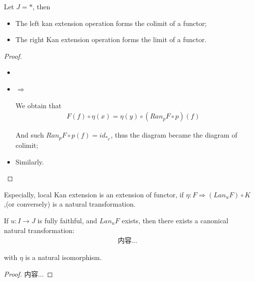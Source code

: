 \documentclass[Total.tex]{subfiles}
\begin{document}
			\begin{proposition}
				Let $J=*$, then 
				\begin{itemize}
					\item The left kan extension operation forms the colimit of a functor;
					\item The right Kan extension operation forms the limit of a functor. 
				\end{itemize}
			\end{proposition}
			\begin{proof}
				\begin{itemize}
					\item 
					
					\item 
					\begin{center}
						$\Rightarrow$
					\end{center}
					
					We obtain that
					\begin{gather*}
						F(f)\circ \eta(x)=\eta(y)\circ (Ran_p F\circ p)(f)
					\end{gather*}
					
					And such $Ran_p F\circ p(f)=id_{*_\mathcal{C}}$, thus the diagram became the diagram of colimit;
					
					\item Similarly. 
				\end{itemize}
			\end{proof}
			
			
			Especially, local Kan extension is an extension of functor, if $\eta:F\Rightarrow (Lan_u F)\circ K$,(or conversely) is a natural transformation. 
			
			\begin{proposition}
				If $u:I\rightarrow J$ is fully faithful, and $Lan_u F$ exists, then there exists a canonical natural transformation:
				\begin{gather*}
					内容...
				\end{gather*}
				
				with $\eta$ is a natural isomorphism. 
			\end{proposition}
			\begin{proof}
				内容...
			\end{proof}
\end{document}
